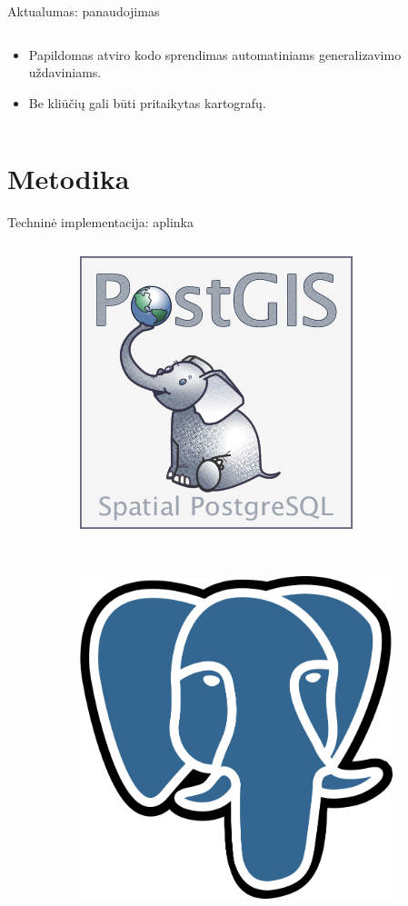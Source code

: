 \documentclass[14pt]{beamer}
\begin{document}
\begin{frame}{Aktualumas: panaudojimas}
\begin{columns}[c]
\begin{column}{.7\textwidth}
\begin{itemize}
        \item Papildomas atviro kodo sprendimas automatiniams generalizavimo
          uždaviniams.

        \item Be kliūčių gali būti pritaikytas kartografų.

      \end{itemize}
    \end{column}
  \end{columns}
\end{frame}


\section{Metodika}

\begin{frame}{Techninė implementacija: aplinka}
  \begin{columns}[c]
    \begin{column}{.3\textwidth}
      \begin{figure}[ht]
        \begin{subfigure}[b]{\textwidth}
          \centering
          \includegraphics[width=.7\textwidth]{postgis-logo}
        \end{subfigure}
        \\[1ex]
        \begin{subfigure}[b]{\textwidth}
          \centering
          \includegraphics[width=.5\textwidth]{postgresql-logo}

\end{subfigure}
\end{figure}
\end{column}
\end{columns}
\end{frame}
\end{document}
